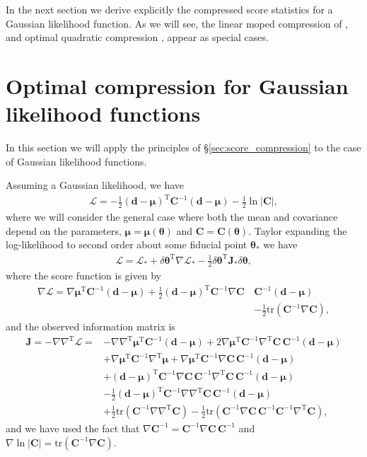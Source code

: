 \documentclass[fleqn,usenatbib]{mnras}
\def\f{\frac}
\def\btheta{\boldsymbol{\theta}}
\def\data{\mathbf{d}}
\def\mean{\boldsymbol{\mu}}
\def\transpose{\mathrm{T}}
\def\L{\mathcal{L}}
\def\transpose{\mathrm{T}}
\def\cov{\mathbf{C}}
\def\tr{\mathrm{tr}}
\begin{document}
In the next section we derive explicitly the compressed score statistics for a Gaussian likelihood function. As we will see, the linear {\sc moped} compression of \citet{Heavens2000a}, and optimal quadratic compression \citep{1997PhRvD..55.5895T,Bond1998,Bond2000}, appear as special cases.
%
\section{Optimal compression for Gaussian likelihood functions}
\label{sec:gaussian_compression}
In this section we will apply the principles of \S \ref{sec:score_compression} to the case of Gaussian likelihood functions.

Assuming a Gaussian likelihood, we have
\begin{align}
\label{gaussian}
\L = -\f{1}{2}(\data - \mean)^\transpose \cov^{-1}(\data - \mean) - \f{1}{2}\ln|\cov|,
\end{align}
where we will consider the general case where both the mean and covariance depend on the parameters, $\mean = \mean(\btheta)$ and $\cov=\cov(\btheta)$. Taylor expanding the log-likelihood to second order about some fiducial point $\btheta_*$ we have
\begin{align}
\label{gauss_taylor}
\L = \L_* + \delta\btheta^\transpose\nabla\L_* - \f{1}{2}\delta\btheta^\transpose\mathbf{J}_*\delta\btheta,
\end{align}
where the score function is given by
\begin{align}
\label{gauss_score}
\nabla\L = \nabla\mean^\transpose\cov^{-1}(\data - \mean) + \f{1}{2}(\data - \mean)^\transpose \cov^{-1}\nabla \cov\,&\cov^{-1}(\data - \mean) \nonumber \\
&- \f{1}{2}\tr(\cov^{-1}\nabla \cov),
\end{align}
and the observed information matrix is
\begin{align}
\label{gauss_observed_information}
\mathbf{J} = -\nabla\nabla^\transpose\L =& -\nabla\nabla^\transpose\mean^\transpose\cov^{-1}(\data - \mean) 
+ 2\nabla\mean^\transpose\cov^{-1}\nabla^\transpose\cov\,\cov^{-1}(\data - \mean) \nonumber \\
&+ \nabla\mean^\transpose\cov^{-1}\nabla^\transpose\mean
+\nabla\mean^\transpose\cov^{-1}\nabla\cov\,\cov^{-1}(\data - \mean) \nonumber \\
&+(\data - \mean)^\transpose\cov^{-1}\nabla\cov\,\cov^{-1}\nabla^\transpose\cov\,\cov^{-1}(\data - \mean) \nonumber \\
&-\f{1}{2}(\data - \mean)^\transpose\cov^{-1}\nabla\nabla^\transpose\cov\,\cov^{-1}(\data - \mean) \nonumber \\
&+ \f{1}{2}\tr\left(\cov^{-1}\nabla\nabla^\transpose\cov\right)  
 - \f{1}{2}\tr\left(\cov^{-1}\nabla\cov\,\cov^{-1}\cov^{-1}\nabla^\transpose\cov\right),
\end{align}
and we have used the fact that $\nabla\cov^{-1}=\cov^{-1}\nabla\cov\,\cov^{-1}$ and $\nabla\ln|\cov|=\tr(\cov^{-1}\nabla \cov)$.
\end{document}
